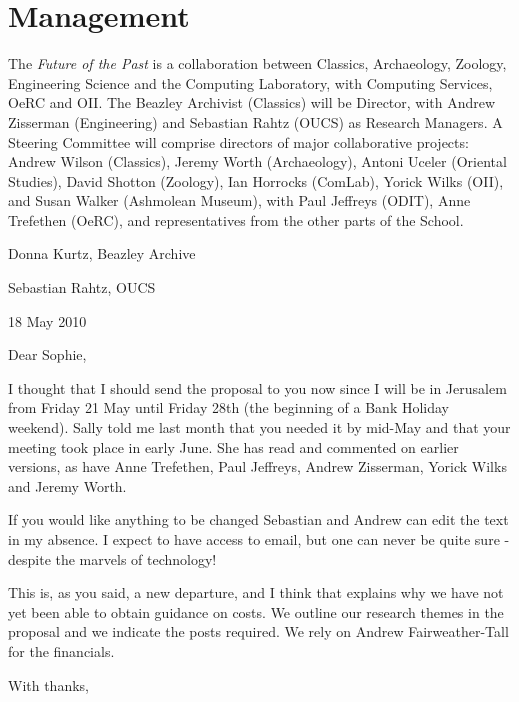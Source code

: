 \documentclass[11pt,twoside]{article}\makeatletter
\makeatletter
\renewcommand\section{\@startsection {section}{1}{\z@}%
     {-1.75ex \@plus -0.5ex \@minus -.2ex}%
     {0.5ex \@plus .2ex}%
     {\reset@font\Large\bfseries\sffamily}}
\def\DivI{\section}
\def\DivI{\chapter}
\makeatother
\begin{document}
\DivI[Management]{Management}\par The \textit{Future of the Past }is a collaboration between Classics, Archaeology, Zoology, Engineering Science and the Computing Laboratory, with Computing Services, OeRC and OII. The Beazley Archivist (Classics) will be Director, with Andrew Zisserman (Engineering) and Sebastian Rahtz (OUCS) as Research Managers. A Steering Committee will comprise directors of major collaborative projects: Andrew Wilson (Classics), Jeremy Worth (Archaeology), Antoni Uceler (Oriental Studies), David Shotton (Zoology), Ian Horrocks (ComLab), Yorick Wilks (OII), and Susan Walker (Ashmolean Museum), with Paul Jeffreys (ODIT), Anne Trefethen (OeRC), and representatives from the other parts of the School.\par Donna Kurtz, Beazley Archive\par Sebastian Rahtz, OUCS\par 18 May 2010\par \par Dear Sophie,\par I thought that I should send the proposal to you now since I will be in Jerusalem from Friday 21 May until Friday 28th (the beginning of a Bank Holiday weekend).  Sally told me last month that you needed it by mid-May and that your meeting took place in early June.  She has read and commented on earlier versions,  as have Anne Trefethen, Paul Jeffreys, Andrew Zisserman, Yorick Wilks and Jeremy Worth. \par If you would like anything to be changed Sebastian and Andrew can edit the text in my absence.  I expect to have access to email, but one can never be quite sure - despite the marvels of technology! \par This is, as you said, a new departure, and I think that explains why we have not yet been able to obtain guidance on costs. We outline our research themes in the proposal and we indicate the posts required. We rely on Andrew Fairweather-Tall for the financials.\par With thanks,
\end{document}
